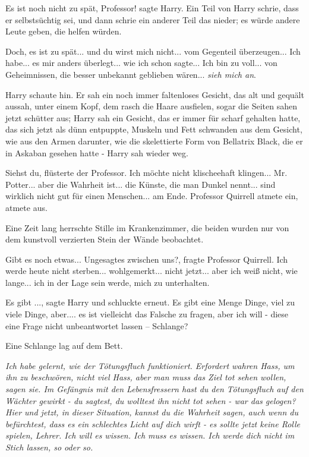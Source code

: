 \glqq{}Es ist noch nicht zu spät, Professor!\grqq{} sagte Harry. Ein Teil von
Harry schrie, dass er selbstsüchtig sei, und dann schrie ein anderer Teil das
nieder; es würde andere Leute geben, die helfen würden.

\glqq{}Doch, es ist zu spät... und du wirst mich nicht... vom Gegenteil
überzeugen... Ich habe... es mir anders überlegt... wie ich schon sagte... Ich
bin zu voll... von Geheimnissen, die besser unbekannt geblieben wären...
\emph{sieh mich an}.\grqq{}

Harry schaute hin. Er sah ein noch immer faltenloses Gesicht, das alt und
gequält aussah, unter einem Kopf, dem rasch die Haare ausfielen, sogar die
Seiten sahen jetzt schütter aus; Harry sah ein Gesicht, das er immer für scharf
gehalten hatte, das sich jetzt als dünn entpuppte, Muskeln und Fett schwanden
aus dem Gesicht, wie aus den Armen darunter, wie die skelettierte Form von
Bellatrix Black, die er in Askaban gesehen hatte - Harry sah wieder weg.

\glqq{}Siehst du\grqq{}, flüsterte der Professor. \glqq{}Ich möchte nicht
klischeehaft klingen... Mr. Potter... aber die Wahrheit ist... die Künste, die
man Dunkel nennt... sind wirklich nicht gut für einen Menschen... am
Ende.\grqq{} Professor Quirrell atmete ein, atmete aus.

Eine Zeit lang herrschte Stille im Krankenzimmer, die beiden wurden nur von dem
kunstvoll verzierten Stein der Wände beobachtet.

\glqq{}Gibt es noch etwas... Ungesagtes zwischen uns?\grqq{}, fragte Professor
Quirrell. \glqq{}Ich werde heute nicht sterben... wohlgemerkt... nicht jetzt...
aber ich weiß nicht, wie lange... ich in der Lage sein werde, mich zu
unterhalten.\grqq{}

\glqq{}Es gibt ...\grqq{}, sagte Harry und schluckte erneut. \glqq{}Es gibt eine
Menge Dinge, viel zu viele Dinge, aber.... es ist vielleicht das Falsche zu
fragen, aber ich will - diese eine Frage nicht unbeantwortet lassen – Schlange?\grqq{}

Eine Schlange lag auf dem Bett.

\glqq{}\emph{Ich habe gelernt, wie der Tötungsfluch funktioniert. Erfordert
wahren Hass, um ihn zu beschwören, nicht viel Hass, aber man muss das Ziel tot
sehen wollen, sagen sie. Im Gefängnis mit den Lebensfressern hast du den
Tötungsfluch auf den Wächter gewirkt - du sagtest, du wolltest ihn nicht tot
sehen - war das gelogen? Hier und jetzt, in dieser Situation, kannst du die
Wahrheit sagen, auch wenn du befürchtest, dass es ein schlechtes Licht auf dich
wirft - es sollte jetzt keine Rolle spielen, Lehrer. Ich will es wissen. Ich
muss es wissen. Ich werde dich nicht im Stich lassen, so oder so.}\grqq{}

